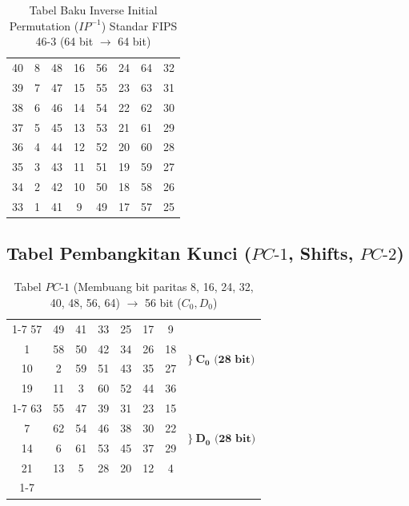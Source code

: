\documentclass[11pt,a4paper]{article}
\begin{document}
\begin{table}[H]
\centering
\caption{Tabel Baku Inverse Initial Permutation ($IP^{-1}$) Standar FIPS 46-3 (64 bit $\to$ 64 bit)}
\label{tab:ip_inv_table}
\vspace{0.2cm}
\begin{tabular}{|cccccccc|}
\hline
40 & 8 & 48 & 16 & 56 & 24 & 64 & 32 \\
39 & 7 & 47 & 15 & 55 & 23 & 63 & 31 \\
38 & 6 & 46 & 14 & 54 & 22 & 62 & 30 \\
37 & 5 & 45 & 13 & 53 & 21 & 61 & 29 \\
36 & 4 & 44 & 12 & 52 & 20 & 60 & 28 \\
35 & 3 & 43 & 11 & 51 & 19 & 59 & 27 \\
34 & 2 & 42 & 10 & 50 & 18 & 58 & 26 \\
33 & 1 & 41 & 9  & 49 & 17 & 57 & 25 \\
\hline
\end{tabular}
\end{table}

\subsection{Tabel Pembangkitan Kunci ($PC\text{-}1$, Shifts, $PC\text{-}2$)}

\begin{table}[H]
\centering
\caption{Tabel $PC\text{-}1$ (Membuang bit paritas 8, 16, 24, 32, 40, 48, 56, 64) $\to$ 56 bit ($C_0, D_0$)}
\vspace{0.2cm}
\begin{tabular}{|ccccccc|l}
\cline{1-7}
57 & 49 & 41 & 33 & 25 & 17 & 9  & \multirow{4}{*}{$\Big\}\ \mathbf{C_0\text{ (28 bit)}}$} \\
1  & 58 & 50 & 42 & 34 & 26 & 18 & \\
10 & 2  & 59 & 51 & 43 & 35 & 27 & \\
19 & 11 & 3  & 60 & 52 & 44 & 36 & \\
\cline{1-7}
63 & 55 & 47 & 39 & 31 & 23 & 15 & \multirow{4}{*}{$\Big\}\ \mathbf{D_0\text{ (28 bit)}}$} \\
7  & 62 & 54 & 46 & 38 & 30 & 22 & \\
14 & 6  & 61 & 53 & 45 & 37 & 29 & \\
21 & 13 & 5  & 28 & 20 & 12 & 4  & \\
\cline{1-7}
\end{tabular}
\end{table}
\end{document}

